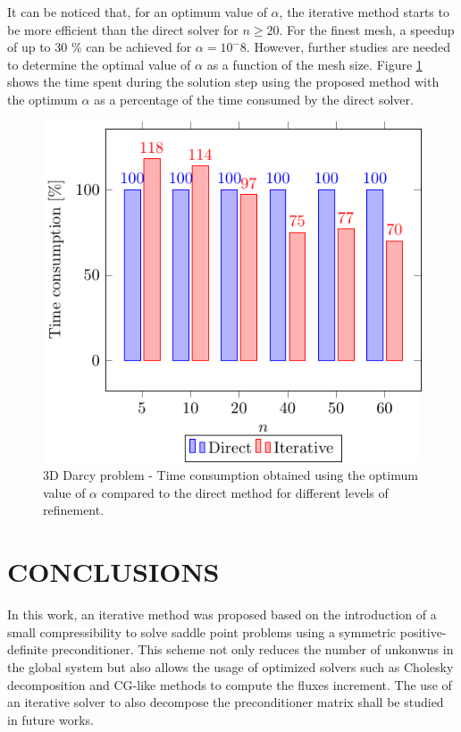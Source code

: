 \documentclass{wccm2024}
\begin{document}
It can be noticed that, for an optimum value of $\alpha$, the iterative method starts to be more efficient than the direct solver for $n \geq 20$. For the finest mesh, a speedup of up to 30 \% can be achieved for $\alpha=10^-8$. However, further studies are needed to determine the optimal value of $\alpha$ as a function of the mesh size. Figure \ref{fig:speedup} shows the time spent during the solution step using the proposed method with the optimum $\alpha$ as a percentage of the time consumed by the direct solver.
\vskip -0.3cm
\begin{figure}
    \centering
    \includegraphics[scale=1.0]{figs/speedup.pdf}
    \caption{3D Darcy problem - Time consumption obtained using the optimum value of $\alpha$ compared to the direct method for different levels of refinement.}
    \label{fig:speedup}
\end{figure}

\section{CONCLUSIONS}

In this work, an iterative method was proposed based on the introduction of a small compressibility to solve saddle point problems using a symmetric positive-definite preconditioner. This scheme not only reduces the number of unkonwns in the global system but also allows the usage of optimized solvers such as Cholesky decomposition and CG-like methods to compute the fluxes increment. The use of an iterative solver to also decompose the preconditioner matrix shall be studied in future works.
\end{document}
